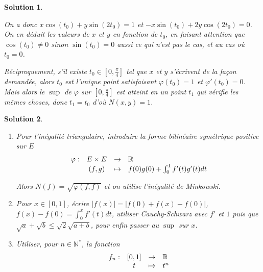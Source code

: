 \documentclass[12pt]{article}
\newtheorem{solution}{Solution}[section]
\theoremstyle{remark}
\newcommand{\N}{\mathbb{N}} \newcommand{\Z}{\mathbb{Z}}
\newcommand{\function}[5]{
	$$
	\begin{array}{rccl}
		#1: & #2 & \to & #3 \\
		& #4 & \mapsto & #5
	\end{array}
	$$
}
\numberwithin{equation}{section}
\begin{document}
\begin{solution}
\begin{enumerate}
		On a donc $x\cos(t_{0})+y\sin(2t_{0})=1$ et $-x\sin(t_{0})+2y\cos(2t_{0})=0$. On en déduit les valeurs de $x$ et $y$ en fonction de $t_{0}$, en faisant attention que $\cos(t_{0})\neq0$ sinon $\sin(t_{0})=0$ aussi ce qui n'est pas le cas, et au cas où $t_{0}=0$.

		Réciproquement, s'il existe $t_{0}\in[0,\frac{\pi}{4}]$ tel que $x$ et $y$ s'écrivent de la façon demandée, alors $t_{0}$ est l'unique point satisfaisant $\varphi(t_{0})=1$ et $\varphi'(t_{0})=0$. Mais alors le $\sup$ de $\varphi$ sur $[0,\frac{\pi}{4}]$ est atteint en un point $t_{1}$ qui vérifie les mêmes choses, donc $t_{1}=t_{0}$ d'où $N(x,y)=1$.
	\end{enumerate}
\end{solution}

\begin{solution}
	\phantom{}
	\begin{enumerate}
		\item Pour l'inégalité triangulaire, introduire la forme bilinéaire symétrique positive sur $E$ \function{\varphi}{E\times E}{\R}{(f,g)}{f(0)g(0)+\int_{0}^{1}f'(t)g'(t)dt}
		Alors $N(f)=\sqrt{\varphi(f,f)}$ et on utilise l'inégalité de Minkowski.
		\item Pour $x\in[0,1]$, écrire $\vert f(x)\vert=\vert f(0)+f(x)-f(0)\vert$, $f(x)-f(0)=\int_{0}^{x}f'(t)dt$, utiliser Cauchy-Schwarz avec $f'$ et $1$ puis que $\sqrt{a}+\sqrt{b}\leqslant\sqrt{2}\sqrt{a+b}$, pour enfin passer au $\sup$ sur $x$.
		\item Utiliser, pour $n\in\N^{*}$, la fonction \function{f_n}{[0,1]}{\R}{t}{t^n}
	\end{enumerate}
\end{solution}
\end{document}
